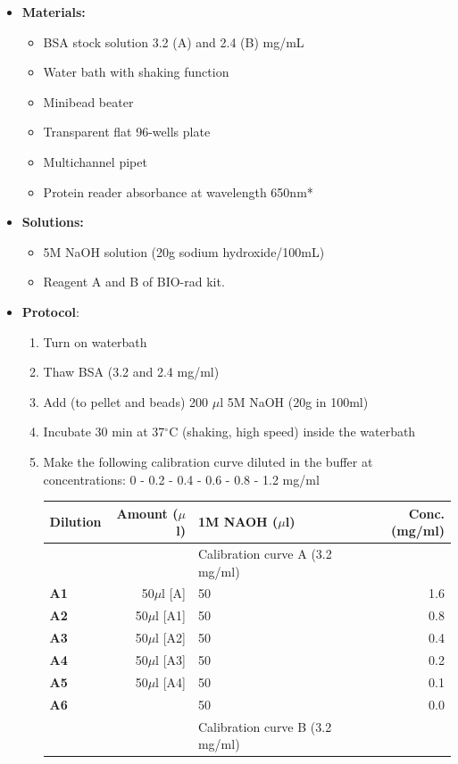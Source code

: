 \documentclass{EU-report}
\begin{document}
\begin{itemize}
\item \textbf{Materials:}
\begin{itemize} 
\item BSA stock solution 3.2 (A) and 2.4 (B) mg/mL
\item Water bath with shaking function
\item Minibead beater
\item Transparent flat 96-wells plate
\item Multichannel pipet
\item Protein reader absorbance at wavelength 650nm*
\end{itemize}
\item \textbf{Solutions:}
\begin{itemize}
\item 5M NaOH solution (20g sodium hydroxide/100mL)
\item Reagent A and B of BIO-rad kit.
\end{itemize}
\item\textbf{Protocol}:
\begin{enumerate}
\item Turn on waterbath 
\item Thaw BSA (3.2 and 2.4 mg/ml)
\item Add (to pellet and beads) 200 $\mu$l 5M NaOH (20g in 100ml)
\item Incubate 30 min at 37$^{\circ}$C (shaking, high speed) inside the waterbath
\item Make the following calibration curve diluted in the buffer at concentrations: 0 - 0.2 - 0.4 - 0.6 - 0.8 - 1.2 mg/ml
\begin{center}
	\begin{tabular}{lrp{7cm}r} \hline\hline
\textbf{Dilution} & \textbf{Amount ($\mu$l)} 	 & \textbf{ 1M NAOH ($\mu$l)} & \textbf{ Conc. (mg/ml)} \\
\hline
 \textbf{}	               &                                              & Calibration curve A (3.2 mg/ml) 					                        & \\
 \hline
 \textbf{A1}	 	& 50$\mu$l [A]	                                        & 50							& 1.6\\
 \hline
 \textbf{A2}	 	& 50$\mu$l [A1]			              & 50						        & 0.8\\
 \hline
 \textbf{A3}	 	& 50$\mu$l [A2]			 	      & 50						       & 0.4\\
 \hline
 \textbf{A4}	       &  50$\mu$l [A3]			   	              & 50						       & 0.2\\
 \hline
 \textbf{A5}	       & 50$\mu$l [A4]	                                       & 50					               & 0.1\\
 \hline
 \textbf{A6}	       &                                                               & 50					               & 0.0\\
 \hline
 \textbf{}	               &                                               & Calibration curve B (3.2 mg/ml)					                        & \\
 \hline


\end{tabular}
\end{center}
\end{enumerate}
\end{itemize}
\end{document}
